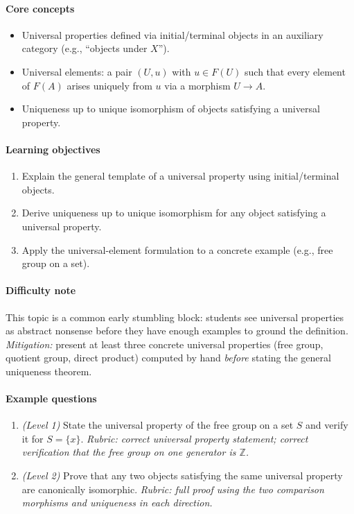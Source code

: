 \documentclass{article}
\begin{document}
\paragraph{Core concepts}
\begin{itemize}[nosep]
  \item Universal properties defined via initial/terminal objects in an auxiliary category (e.g., ``objects under $X$'').
  \item Universal elements: a pair $(U,u)$ with $u \in F(U)$ such that every element of $F(A)$ arises uniquely from $u$ via a morphism $U \to A$.
  \item Uniqueness up to unique isomorphism of objects satisfying a universal property.
\end{itemize}
\paragraph{Learning objectives}
\begin{enumerate}[nosep]
  \item Explain the general template of a universal property using initial/terminal objects.
  \item Derive uniqueness up to unique isomorphism for any object satisfying a universal property.
  \item Apply the universal-element formulation to a concrete example (e.g., free group on a set).
\end{enumerate}
\paragraph{Difficulty note}
This topic is a common early stumbling block: students see universal properties as abstract nonsense before they have enough examples to ground the definition. \emph{Mitigation:} present at least three concrete universal properties (free group, quotient group, direct product) computed by hand \emph{before} stating the general uniqueness theorem.
\paragraph{Example questions}
\begin{enumerate}[nosep]
  \item \emph{(Level 1)} State the universal property of the free group on a set $S$ and verify it for $S = \{x\}$. \emph{Rubric: correct universal property statement; correct verification that the free group on one generator is $\mathbb{Z}$.}
  \item \emph{(Level 2)} Prove that any two objects satisfying the same universal property are canonically isomorphic. \emph{Rubric: full proof using the two comparison morphisms and uniqueness in each direction.}
\end{enumerate}
\end{document}
